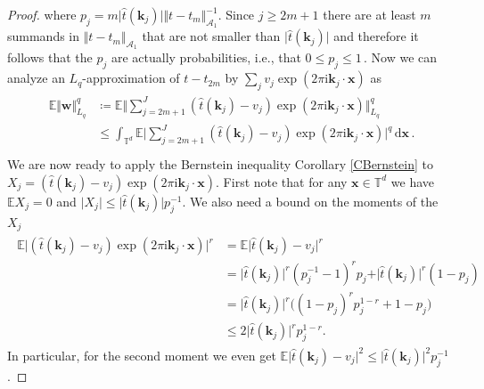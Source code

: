 \documentclass[11pt,reqno]{article}
\numberwithin{equation}{section}
\theoremstyle{definition}
\theoremstyle{plain}
\newcommand{\tor}{\ensuremath{\mathbb{T}}}
\newcommand{\E}{\ensuremath{\mathbb{E}}}
\newcommand{\p}{\ensuremath{\mathbb{P}}}
\newcommand{\ca}{\ensuremath{\mathcal A}}
\newcommand{\bk}{\ensuremath{\mathbf k}}
\newcommand{\bx}{\ensuremath{\mathbf x}}
\newcommand{\bw}{\ensuremath{\mathbf w}}
\begin{document}
\begin{proof}
 \noindent where 
 \(p_j = m\vert \hat{t}(\bk_j) \vert \Vert t-t_m \Vert_{\ca_1}^{-1} \).
Since \(j \geq 2m+1\) there are at least \(m\) summands in \(\Vert t-t_m \Vert_{\ca_1}\) that are not smaller than \(\vert \hat{t}(\bk_j) \vert \) and therefore it follows that the \(p_j\) are actually probabilities, i.e., that \(0 \leq p_j \leq 1\)\,.
Now we can analyze an $L_q$-approximation of \(t-t_{2m}\) by \(\sum_j v_j\exp(2\pi \mathrm{i} 
\bk_j\cdot \bx)\)
as
\begin{align} \label{EtoP}
\begin{split}
\E \Vert \bw \Vert_{L_q}^q 
&  \coloneqq \E \Big\Vert \sum_{j=2m+1}^J (\hat{t}(\bk_j) - v_j)\exp(2 \pi \mathrm{i} \bk_j \cdot \bx)  \Big\Vert_{L_q}^q \\
& \leq  \int_{\tor^d} \E \Big\vert \sum_{j=2m+1}^J (\hat{t}(\bk_j) - v_j)   \exp(2 \pi \mathrm{i} \bk_j\cdot \bx) \Big\vert^q \, \mathrm{d}\bx \,. \\
\end{split}
\end{align}
We are now ready to apply the Bernstein inequality Corollary \ref{CBernstein} to \(X_j = (\hat{t}(\bk_j) - v_j) \exp(2 \pi \mathrm{i} \bk_j\cdot \bx)\). First note that for any $\bx \in \tor^d$ we have \(\E X_j = 0\) and \(\big\vert X_j \big\vert \leq \vert\hat{t}(\bk_j)\vert p_j^{-1}  \). 
We also need a bound on the moments of the \(X_j\)
\begin{align}
\begin{split}
\E \big\vert(\hat{t}(\bk_j) - v_j)\exp(2 \pi \mathrm{i} \bk_j\cdot \bx)\big\vert^r
&=  \E \big\vert\hat{t}(\bk_j) - v_j\big\vert^r \\
& =  \vert \hat{t}(\bk_j) \vert^r (p_j^{-1} -1 )^r p_j + \vert \hat{t}(\bk_j) \vert^r(1-p_j) \\
& = \vert \hat{t}(\bk_j) \vert^r \big( (1 - p_j)^r p_j^{1-r} + 1 -p_j \big) \\
& \leq 2 \vert\hat{t}(\bk_j) \vert^r p_j^{1-r}.
\end{split}
\end{align}
In particular, for the second moment we even get \(\E \big|\hat{t}(\bk_j) - v_j\big\vert^2  \leq \vert\hat{t}(\bk_j) \vert^2 p_j^{-1} \).


\end{proof}
\end{document}
